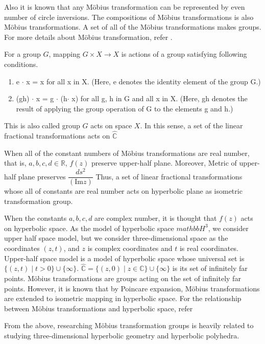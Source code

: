 Also it is known that any M\"obius transformation can be represented by
even number of circle inversions.
The compositions of M\"obius transformations is also M\"obius
transformations. A set of all of the M\"obius transformations makes
groups. For more details about M\"obius transformation, refer
\cite{MumfordSeriesWright200204}\cite{marden_2016}.

For a group $G$, mapping $G \times X \to X$ is actions of a group
satisfying following conditions.
\begin{enumerate}
 \item e $\cdot$ x = x for all x in X. (Here, e denotes the identity element of
       the group G.)
 \item (gh) $\cdot$ x = g $\cdot$ (h$\cdot$ x) for all g, h in G and all x in X.
       (Here, gh denotes the result of applying the group operation of G to the elements g and h.)
\end{enumerate}
This is also called group $G$ acts on space $X$.
In this sense, a set of the linear fractional transformations acts on
$\hat{\mathbb{C}}$

When all of the constant numbers of M\"obius transformations are real number,
that is, $a, b, c, d \in \mathbb{R}$, $f(z)$ preserve upper-half plane.
Moreover, Metric of upper-half plane preserves
$\dfrac{ds^2}{(\mathrm{Im}z)}$
Thus, a set of linear fractional transformations whose all of constants
are real number acts on hyperbolic plane as isometric transformation group.

When the constants $a, b, c, d$ are complex number, it is thought that
$f(z)$ acts on hyperbolic space.
As the model of hyperbolic space $mathbb{H}^3$, we consider upper half
space model, but we consider three-dimensional space as the coordinates
$(z, t)$, and $z$ is complex coordinates and $t$ is real coordinates.
Upper-half space model is a model of hyperbolic space whose universal
set is $\{(z,t) \mid t>0\}\cup \{ \infty \}$.
$\hat{\mathbb{C}} = \{ (z,0) \mid z \in \mathbb{C}\} \cup \{ \infty\}$
is its set of infinitely far points. M\"obius transformations are groups acting on
the set of infinitely far points. However, it is known that by Poincare
expansion, M\"obius transformations are extended to isometric mapping
in hyperbolic space.
For the relationship between M\"obius transformations and hyperbolic
space, refer 
\cite{Marden200705outerCircles}\cite{taniguchi_okumura199610invitation}

From the above, researching M\"obius transformation groups is heavily
related to studying three-dimensional hyperbolic geometry and hyperbolic
polyhedra.

